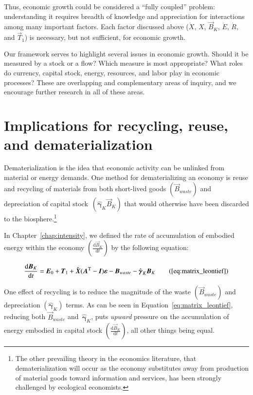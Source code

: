 Thus, economic growth could be considered a ``fully coupled'' problem:
understanding it requires breadth of knowledge and appreciation for 
interactions among many important factors.
Each factor discussed above 
($\dot{X}$, $X$, $\vec{B}_{K}$, $\dot{E}$, $\dot{R}$, and $\vec{T}_{1}$)
is necessary, but not sufficient, for economic growth.

Our framework serves to highlight several issues in economic growth. 
Should it be measured by a stock or a flow? 
Which measure is most appropriate? 
What roles do currency, capital stock, energy, resources, and labor
play in economic processes?
These are overlapping and complementary areas of inquiry, and
we encourage further research in all of these areas.


\section{Implications for recycling, reuse, and dematerialization}
\label{sec:recycling}

Dematerialization is the idea that economic activity can be unlinked 
from material or energy demands.\cite{FischerKowalski:2011uo} 
One method for dematerializing an economy 
is reuse and recycling of materials from both
short-lived goods
$\left(\vec{B}_{waste}\right)$
and depreciation of 
capital 
stock~$\left(\hat{\boldsymbol{\gamma}}_{K}\vec{B}_{K}\right)$
that would otherwise have
been discarded to the biosphere.\footnote{The 
other prevailing theory in the economics literature, that
dematerialization will occur as the economy substitutes away from production of material goods 
toward information and services, has been strongly challenged 
by ecological economists.\cite{Bartelmus:2003vi,parrinello2004service}}

In Chapter~\ref{chap:intensity},
we defined the rate of accumulation 
of embodied energy within the economy
$\left(\frac{\mathrm{d}\vec{B}_{K}}{\mathrm{d}t}\right)$
by the following equation:

\begin{equation}
	\frac{\mathrm{d}\vec{B}_{K}}{\mathrm{d}t} 
	= \vec{E}_{0}
	+ \vec{T}_{1}
	+ \hat{\vec{X}} (\vec{A}^{\mathrm{T}} - \vec{I})\boldsymbol{\varepsilon} 
	- \vec{B}_{waste}
	- \hat{\boldsymbol{\gamma}}_{K}\vec{B}_{K}\tag{\ref{eq:matrix_leontief}}
\end{equation}

One effect of recycling is to reduce the magnitude 
of the waste 
$\left(\vec{B}_{waste}\right)$
and depreciation 
$\left(\hat{\boldsymbol{\gamma}}_{K}\right)$ terms.
As can be seen in Equation~\ref{eq:matrix_leontief},
reducing both $\vec{B}_{waste}$ 
and~$\hat{\boldsymbol{\gamma}}_{K}$, 
puts \emph{upward} pressure on the accumulation of 
energy embodied in capital stock
$\left(\frac{\mathrm{d}\vec{B}_{K}}{\mathrm{d}t}\right)$,
all other things being equal.

